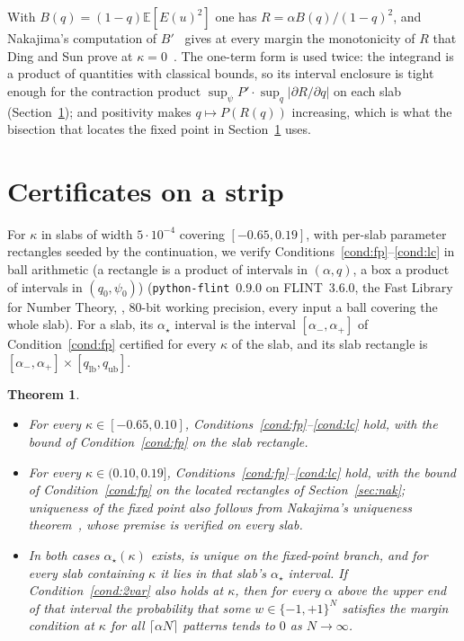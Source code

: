 \documentclass[11pt]{article}
\newtheorem{theorem}{Theorem}
\theoremstyle{remark}
\newcommand{\E}{\mathbb{E}}
\begin{document}
With $B(q)=(1-q)\E[E(u)^2]$ one has $R=\alpha B(q)/(1-q)^2$, and
Nakajima's computation of $B'$~\cite[eq.~(18)]{nakajima2025} gives at every margin the monotonicity of $R$ that Ding
and Sun prove at $\kappa=0$~\cite[Lemma~7.3]{ding2019capacity}.  The
one-term form is used twice: the integrand is a product of quantities
with classical bounds, so its interval enclosure is tight enough for
the contraction product
$\sup_\psi P'\cdot\sup_q|\partial R/\partial q|$ on each slab
(Section~\ref{sec:slabs}); and positivity makes
$q\mapsto P(R(q))$ increasing, which is what the bisection that locates the fixed point in
Section~\ref{sec:slabs} uses.

\section{Certificates on a strip}\label{sec:slabs}

For $\kappa$ in slabs of width $5\cdot10^{-4}$ covering
$[-0.65,0.19]$, with per-slab parameter rectangles seeded by the
continuation, we verify
Conditions~\ref{cond:fp}--\ref{cond:lc} in ball arithmetic (a
rectangle is a product of intervals in $(\alpha,q)$, a box a product
of intervals in $(q_0,\psi_0)$)
(\texttt{python-flint}~0.9.0 on FLINT~3.6.0, the Fast Library for Number Theory, \cite{arb2017}, 80-bit working precision, every input a ball
covering the whole slab).  For a slab, its $\alpha_\star$ interval is the
interval $[\alpha_-,\alpha_+]$ of Condition~\ref{cond:fp} certified for
every $\kappa$ of the slab, and its slab rectangle is
$[\alpha_-,\alpha_+]\times[q_{\mathrm{lb}},q_{\mathrm{ub}}]$.

\begin{theorem}\label{thm:strip}
\begin{itemize}
\item[(a)] For every $\kappa\in[-0.65,0.10]$,
Conditions~\ref{cond:fp}--\ref{cond:lc} hold, with the bound of
Condition~\ref{cond:fp} on the slab rectangle.
\item[(b)] For every $\kappa\in(0.10,0.19]$,
Conditions~\ref{cond:fp}--\ref{cond:lc} hold, with the bound of
Condition~\ref{cond:fp} on the located rectangles of
Section~\ref{sec:nak}; uniqueness of the fixed point also follows from
Nakajima's uniqueness theorem~\cite[Theorem~1]{nakajima2025}, whose premise is verified on
every slab.
\item[(c)] In both cases $\alpha_\star(\kappa)$ exists, is unique on
the fixed-point branch, and for every slab containing $\kappa$ it lies
in that slab's $\alpha_\star$ interval.  If Condition~\ref{cond:2var} also holds at
$\kappa$, then for every $\alpha$ above the upper end of that interval
the probability that some $w\in\{-1,+1\}^N$ satisfies the margin
condition at $\kappa$ for all $\lceil\alpha N\rceil$ patterns tends to $0$ as
$N\to\infty$.
\end{itemize}
\end{theorem}
\end{document}
